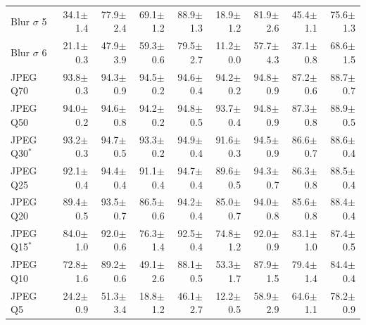 \begin{table}[H]
\begin{tabular}{lrrrrrrrr}
Blur $\sigma$ 5 & 34.1{\scriptsize$\pm$1.4} & 77.9{\scriptsize$\pm$2.4} & 69.1{\scriptsize$\pm$1.2} & 88.9{\scriptsize$\pm$1.3} & 18.9{\scriptsize$\pm$1.2} & 81.9{\scriptsize$\pm$2.6} & 45.4{\scriptsize$\pm$1.1} & 75.6{\scriptsize$\pm$1.3} \\
Blur $\sigma$ 6 & 21.1{\scriptsize$\pm$0.3} & 47.9{\scriptsize$\pm$3.9} & 59.3{\scriptsize$\pm$0.6} & 79.5{\scriptsize$\pm$2.7} & 11.2{\scriptsize$\pm$0.0} & 57.7{\scriptsize$\pm$4.3} & 37.1{\scriptsize$\pm$0.8} & 68.6{\scriptsize$\pm$1.5} \\
\addlinespace
JPEG Q70 & 93.8{\scriptsize$\pm$0.3} & 94.3{\scriptsize$\pm$0.9} & 94.5{\scriptsize$\pm$0.2} & 94.6{\scriptsize$\pm$0.4} & 94.2{\scriptsize$\pm$0.2} & 94.8{\scriptsize$\pm$0.9} & 87.2{\scriptsize$\pm$0.6} & 88.7{\scriptsize$\pm$0.7} \\
JPEG Q50 & 94.0{\scriptsize$\pm$0.2} & 94.6{\scriptsize$\pm$0.8} & 94.2{\scriptsize$\pm$0.2} & 94.8{\scriptsize$\pm$0.5} & 93.7{\scriptsize$\pm$0.4} & 94.8{\scriptsize$\pm$0.9} & 87.3{\scriptsize$\pm$0.8} & 88.9{\scriptsize$\pm$0.5} \\
JPEG Q30$^{*}$ & 93.2{\scriptsize$\pm$0.3} & 94.7{\scriptsize$\pm$0.5} & 93.3{\scriptsize$\pm$0.2} & 94.9{\scriptsize$\pm$0.4} & 91.6{\scriptsize$\pm$0.3} & 94.5{\scriptsize$\pm$0.9} & 86.6{\scriptsize$\pm$0.7} & 88.6{\scriptsize$\pm$0.4} \\
JPEG Q25 & 92.1{\scriptsize$\pm$0.4} & 94.4{\scriptsize$\pm$0.4} & 91.1{\scriptsize$\pm$0.4} & 94.7{\scriptsize$\pm$0.4} & 89.6{\scriptsize$\pm$0.5} & 94.3{\scriptsize$\pm$0.7} & 86.3{\scriptsize$\pm$0.8} & 88.5{\scriptsize$\pm$0.4} \\
JPEG Q20 & 89.4{\scriptsize$\pm$0.5} & 93.5{\scriptsize$\pm$0.7} & 86.5{\scriptsize$\pm$0.6} & 94.2{\scriptsize$\pm$0.4} & 85.0{\scriptsize$\pm$0.7} & 94.0{\scriptsize$\pm$0.8} & 85.6{\scriptsize$\pm$0.8} & 88.4{\scriptsize$\pm$0.4} \\
JPEG Q15$^{*}$ & 84.0{\scriptsize$\pm$1.0} & 92.0{\scriptsize$\pm$0.6} & 76.3{\scriptsize$\pm$1.4} & 92.5{\scriptsize$\pm$0.4} & 74.8{\scriptsize$\pm$1.2} & 92.0{\scriptsize$\pm$0.9} & 83.1{\scriptsize$\pm$1.0} & 87.4{\scriptsize$\pm$0.5} \\
JPEG Q10 & 72.8{\scriptsize$\pm$1.6} & 89.2{\scriptsize$\pm$0.6} & 49.1{\scriptsize$\pm$2.6} & 88.1{\scriptsize$\pm$0.5} & 53.3{\scriptsize$\pm$1.7} & 87.9{\scriptsize$\pm$1.5} & 79.4{\scriptsize$\pm$1.4} & 84.4{\scriptsize$\pm$0.4} \\
JPEG Q5 & 24.2{\scriptsize$\pm$0.9} & 51.3{\scriptsize$\pm$3.4} & 18.8{\scriptsize$\pm$1.2} & 46.1{\scriptsize$\pm$2.7} & 12.2{\scriptsize$\pm$0.5} & 58.9{\scriptsize$\pm$2.9} & 64.6{\scriptsize$\pm$1.1} & 78.2{\scriptsize$\pm$0.9} \\

\end{tabular}
\end{table}
